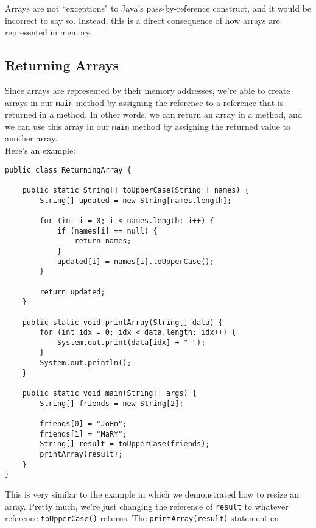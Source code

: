Arrays are not ``exceptions" to Java's pass-by-reference construct, and it would be incorrect to say so. Instead, this is a direct consequence of how arrays are represented in memory.


\subsection{Returning Arrays}

Since arrays are represented by their memory addresses, we're able to create arrays in our \verb!main! method by assigning the reference to a reference that is returned in a method. In other words, we can return an array in a method, and we can use this array in our \verb!main! method by assigning the returned value to another array. \\

Here's an example:

\begin{lstlisting}
public class ReturningArray {

	public static String[] toUpperCase(String[] names) {
		String[] updated = new String[names.length];

		for (int i = 0; i < names.length; i++) {
			if (names[i] == null) {
				return names;
			}
			updated[i] = names[i].toUpperCase();
		}

		return updated;
	}

	public static void printArray(String[] data) {
		for (int idx = 0; idx < data.length; idx++) {
			System.out.print(data[idx] + " ");
		}
		System.out.println();
	}

	public static void main(String[] args) {
		String[] friends = new String[2];

		friends[0] = "JoHn";
		friends[1] = "MaRY";
		String[] result = toUpperCase(friends);
		printArray(result);
	}
}
\end{lstlisting}

This is very similar to the example in which we demonstrated how to resize an array. Pretty much, we're just changing the reference of \verb!result! to whatever reference \verb!toUpperCase()! returns. The \verb!printArray(result)! statement en